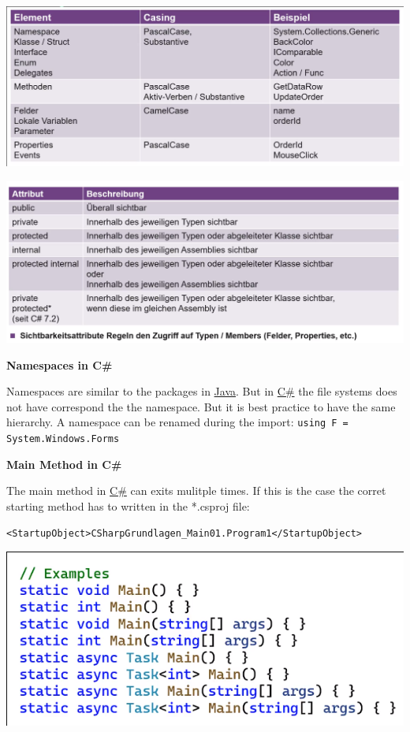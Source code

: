 \documentclass[11pt,twoside,landscape]{article}
\begin{document}
\begin{multicols}{3}
\begin{center}
\includegraphics[width=.9\linewidth]{img/naming_guidelines.png}
\label{org69da6ad}
\end{center}

\begin{center}
\includegraphics[width=.9\linewidth]{img/sichtbarkeitsattribute.png}
\label{org9f4e36c}
\end{center}


\textbf{Namespaces in C\#}

Namespaces are similar to the packages in \href{../../../roam/20201116150053-java.org}{Java}.
But in \href{../../../roam/20211003114158-c.org}{C\#} the file systems does not have correspond the the namespace.
But it is best practice to have the same hierarchy.
A namespace can be renamed during the import: \texttt{using F = System.Windows.Forms}

\textbf{Main Method in C\#}

The main method in \href{../../../roam/20211003114158-c.org}{C\#} can exits mulitple times.
If this is the case the corret starting method has to written in the *.csproj file:

\lstset{language=XML,label= ,caption= ,captionpos=b,numbers=none}
\begin{lstlisting}
<StartupObject>CSharpGrundlagen_Main01.Program1</StartupObject>
\end{lstlisting}

\begin{center}
\includegraphics[width=.9\linewidth]{img/main_methods_example.png}
\label{orgb9b1b9f}
\end{center}


\end{multicols}
\end{document}
